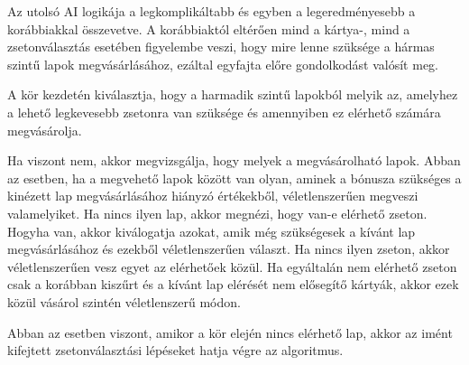 
Az utolsó AI logikája a legkomplikáltabb és egyben a legeredményesebb a korábbiakkal összevetve. A korábbiaktól eltérően mind a kártya-, mind a zsetonválasztás esetében figyelembe veszi, hogy mire lenne szüksége a hármas szintű lapok megvásárlásához, ezáltal egyfajta előre gondolkodást valósít meg.

A kör kezdetén kiválasztja, hogy a harmadik szintű lapokból melyik az, amelyhez a lehető legkevesebb zsetonra van szüksége és amennyiben ez elérhető számára megvásárolja.

Ha viszont nem, akkor megvizsgálja, hogy melyek a megvásárolható lapok. Abban az esetben, ha a megvehető lapok között van olyan, aminek a bónusza szükséges a kinézett lap megvásárlásához hiányzó értékekből, véletlenszerűen megveszi valamelyiket. Ha nincs ilyen lap, akkor megnézi, hogy van-e elérhető zseton. Hogyha van, akkor kiválogatja azokat, amik még szükségesek a kívánt lap megvásárlásához és ezekből véletlenszerűen választ. Ha nincs ilyen zseton, akkor véletlenszerűen vesz egyet az elérhetőek közül. Ha egyáltalán nem elérhető zseton csak a korábban kiszűrt és a kívánt lap elérését nem elősegítő kártyák, akkor ezek közül vásárol szintén véletlenszerű módon.

Abban az esetben viszont, amikor a kör elején nincs elérhető lap, akkor az imént kifejtett zsetonválasztási lépéseket hatja végre az algoritmus.


